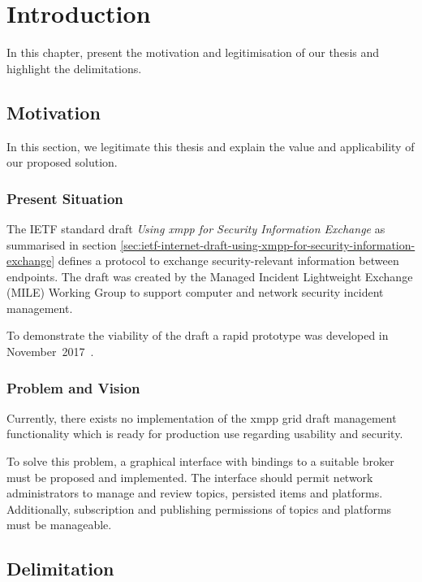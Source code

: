 \newcommand{\code}{\texttt}
\chapter{Introduction}
\label{sec:introduction}

In this chapter, present the motivation and legitimisation of our thesis and highlight the delimitations.

\section{Motivation}
In this section, we legitimate this thesis and explain the value and applicability of our proposed solution.

\subsection{Present Situation}
The IETF standard draft \emph{Using \gls{xmpp} for Security Information Exchange} \cite{ietf-mile-xmpp-grid-05} as summarised in section \ref{sec:ietf-internet-draft-using-xmpp-for-security-information-exchange} defines a protocol to exchange security-relevant information between endpoints.
The draft was created by the Managed Incident Lightweight Exchange (MILE) Working Group to support computer and network security incident management.

To demonstrate the viability of the draft a rapid prototype was developed in November~2017~\cite{xmpp-grid-prototype}.

\subsection{Problem and Vision}
Currently, there exists no implementation of the \gls{xmpp} grid draft management functionality which is ready for production use regarding usability and security.

To solve this problem, a graphical interface with bindings to a suitable \gls{broker} must be proposed and implemented.
The interface should permit network administrators to manage and review \glspl{topic}, persisted items and \glspl{platform}.
Additionally, subscription and publishing permissions of \glspl{topic} and \glspl{platform} must be manageable.

\section{Delimitation} %
